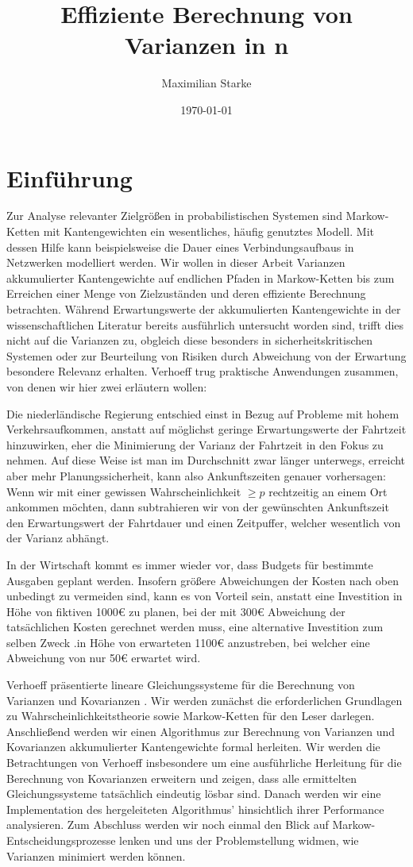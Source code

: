 \documentclass[a4paper]{article}
\title{Effiziente Berechnung von Varianzen in \mc{}n}%
\author{Maximilian Starke}
\affil{Fakultät für Informatik, Technische Universität Dresden}
\date{\today}
\newcommand{\mc}{Markow-Kette}
\theoremstyle{nonumberplain}
\begin{document}
	\section{Einführung}
	
	Zur Analyse relevanter Zielgrößen in probabilistischen Systemen sind \mc{}n mit Kantengewichten ein wesentliches, häufig genutztes Modell. Mit dessen Hilfe kann beispielsweise die Dauer eines Verbindungsaufbaus in Netzwerken modelliert werden. Wir wollen in dieser Arbeit Varianzen akkumulierter Kantengewichte auf endlichen Pfaden in \mc{}n bis zum Erreichen einer Menge von Zielzuständen und deren effiziente Berechnung betrachten.
	Während Erwartungswerte der akkumulierten Kantengewichte in der wissenschaftlichen Literatur bereits ausführlich untersucht worden sind, trifft dies nicht auf die Varianzen zu, obgleich diese besonders in sicherheitskritischen Systemen oder zur Beurteilung von Risiken durch Abweichung von der Erwartung besondere Relevanz erhalten.
	Verhoeff \cite{Verh04} trug praktische Anwendungen zusammen, von denen wir hier zwei erläutern wollen:
	
	Die niederländische Regierung entschied einst in Bezug auf Probleme mit hohem Verkehrsaufkommen, anstatt auf möglichst geringe Erwartungswerte der Fahrtzeit hinzuwirken, eher die Minimierung der Varianz der Fahrtzeit in den Fokus zu nehmen. Auf diese Weise ist man im Durchschnitt zwar länger unterwegs, erreicht aber mehr Planungssicherheit, kann also Ankunftszeiten genauer vorhersagen:
	Wenn wir mit einer gewissen Wahrscheinlichkeit $\geq p$ rechtzeitig an einem Ort ankommen möchten, dann subtrahieren wir von der gewünschten Ankunftszeit den Erwartungswert der Fahrtdauer und einen Zeitpuffer, welcher wesentlich von der Varianz abhängt.
	
	In der Wirtschaft kommt es immer wieder vor, dass Budgets für bestimmte Ausgaben geplant werden. Insofern größere Abweichungen der Kosten nach oben unbedingt zu vermeiden sind, kann es von Vorteil sein, anstatt eine Investition in Höhe von fiktiven 1000\euro{} zu planen, bei der mit 300\euro{} Abweichung der tatsächlichen Kosten gerechnet werden muss, eine alternative Investition zum selben Zweck .in Höhe von erwarteten 1100\euro{} anzustreben, bei welcher eine Abweichung von nur 50\euro{} erwartet wird.
	
	
	Verhoeff präsentierte lineare Gleichungssysteme für die Berechnung von Varianzen und Kovarianzen \cite{Verh04}. Wir werden zunächst die erforderlichen Grundlagen zu Wahrscheinlichkeitstheorie sowie \mc{}n für den Leser darlegen. Anschließend werden wir einen Algorithmus zur Berechnung von Varianzen und Kovarianzen akkumulierter Kantengewichte formal herleiten. Wir werden  die Betrachtungen von Verhoeff insbesondere um eine ausführliche Herleitung für die Berechnung von Kovarianzen erweitern und zeigen, dass alle ermittelten Gleichungssysteme tatsächlich eindeutig lösbar sind. Danach werden wir eine Implementation des hergeleiteten Algorithmus' hinsichtlich ihrer Performance analysieren. Zum Abschluss werden wir noch einmal den Blick auf Markow-Entscheidungsprozesse lenken und uns der Problemstellung widmen, wie Varianzen minimiert werden können.
	
\end{document}
